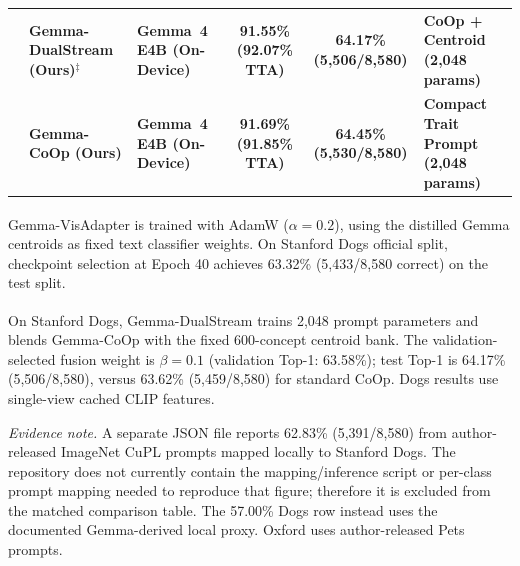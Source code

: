 \documentclass[conference]{IEEEtran}
\begin{document}
\begin{table}[t]
\begin{tabularx}{\textwidth}{p{1.8cm} p{3.2cm} p{3.2cm} c c X}
& \textbf{Gemma-DualStream (Ours)}$^{\ddag}$ & \textbf{Gemma~4 E4B (On-Device)} & \textbf{91.55\% (92.07\% TTA)} & \textbf{64.17\% (5,506/8,580)} & \textbf{CoOp + Centroid (2,048 params)} \\
& \textbf{Gemma-CoOp (Ours)} & \textbf{Gemma~4 E4B (On-Device)} & \textbf{91.69\% (91.85\% TTA)} & \textbf{64.45\% (5,530/8,580)} & \textbf{Compact Trait Prompt (2,048 params)} \\
\bottomrule
\end{tabularx}
\par\vspace{4pt}
\noindent\begin{minipage}{\textwidth}
\scriptsize\linespread{1.05}\selectfont
\textsuperscript{\dag} Gemma-VisAdapter is trained with AdamW ($\alpha = 0.2$), using the distilled Gemma centroids as fixed text classifier weights. On Stanford Dogs official split, checkpoint selection at Epoch 40 achieves 63.32\% (5,433/8,580 correct) on the test split.\par
\textsuperscript{\ddag} On Stanford Dogs, Gemma-DualStream trains 2,048 prompt parameters and blends Gemma-CoOp with the fixed 600-concept centroid bank. The validation-selected fusion weight is $\beta=0.1$ (validation Top-1: 63.58\%); test Top-1 is 64.17\% (5,506/8,580), versus 63.62\% (5,459/8,580) for standard CoOp. Dogs results use single-view cached CLIP features.\par
\emph{Evidence note.} A separate JSON file reports 62.83\% (5,391/8,580) from author-released ImageNet CuPL prompts mapped locally to Stanford Dogs. The repository does not currently contain the mapping/inference script or per-class prompt mapping needed to reproduce that figure; therefore it is excluded from the matched comparison table. The 57.00\% Dogs row instead uses the documented Gemma-derived local proxy. Oxford uses author-released Pets prompts.
\end{minipage}
\end{table}
\end{document}
